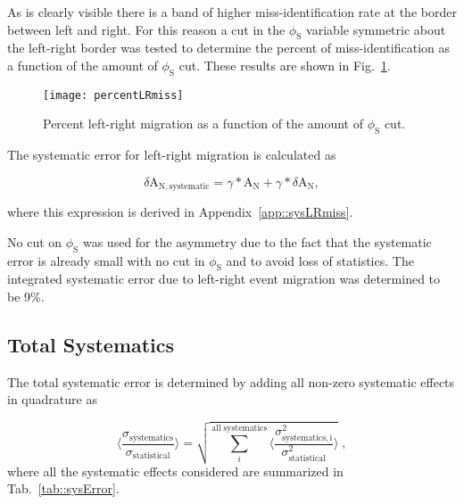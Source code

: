 \noindent
As is clearly visible there is a band of higher miss-identification rate at the
border between left and right.  For this reason a cut in the $\phi_{\mathrm{S}}$
variable symmetric about the left-right border was tested to determine the
percent of miss-identification as a function of the amount of
$\phi_{\mathrm{S}}$ cut.  These results are shown in
Fig.~\ref{fig::percentLRmiss}.

\begin{figure}[h!t]
  \centering
  \texttt{[image: percentLRmiss]}
  \caption{Percent left-right migration as a function of the amount of
    $\phi_{\mathrm{S}}$ cut.}
    \label{fig::percentLRmiss}
\end{figure}

The systematic error for left-right migration is calculated as

\begin{equation}
  \delta \mathrm{A}_{\mathrm{N,systematic}} = \gamma *\mathrm{A}_{\mathrm{N}} +
  \gamma *\delta \mathrm{A}_{\mathrm{N}},
\end{equation}

\noindent
where this expression is derived in Appendix~\ref{app::sysLRmiss}.\par

No cut on $\phi_{\mathrm{S}}$ was used for the asymmetry due to the fact
that the systematic error is already small with no cut in $\phi_{\mathrm{S}}$
and to avoid loss of statistics.  The integrated systematic error due to
left-right event migration was determined to be 9\%.

\subsection{Total Systematics}
The total systematic error is determined by adding all non-zero systematic
effects in quadrature as

\begin{equation}
  \Big \langle
  \frac{
    \sigma_{\mathrm{systematics}}}{\sigma_{\mathrm{statistical}}}
  \Big \rangle =
  \sqrt{
    \sum_i^{\mathrm{all \; systematics}}
    \Big \langle
    \frac{\sigma^2_{\mathrm{systematics,
          i}}}{\sigma^2_{\mathrm{statistical}}}
    \Big \rangle
  } \;,
\end{equation}
where all the systematic effects considered are summarized in
Tab.~\ref{tab::sysError}.

